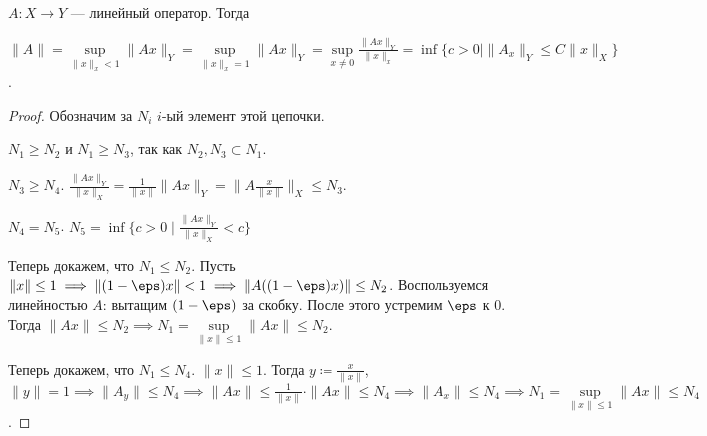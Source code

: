 \begin{theorem}
    $A\!: X \to Y$ --- линейный оператор. Тогда

     $\|A\| = \sup\limits_{\| x\|_x < 1} \|Ax\|_Y = \sup\limits_{\| x\|_x = 1} \|Ax\|_Y = \sup\limits_{x \neq 0} \frac{\|Ax\|_Y}{\|x\|_x} = \inf\{ c > 0 \mid \|A_x\|_Y \le C \|x\|_X\}$.
\end{theorem}
\begin{proof}
    Обозначим за $N_i$  $i$-ый элемент этой цепочки. 

     $N_1 \ge N_2$ и $N_1 \ge N_3$,  так как $N_2, N_3 \subset N_1$. 

     $N_3 \ge N_4$. $\frac{\|Ax\|_Y}{\|x\|_X} = \frac{1}{\|x\|}\|Ax\|_Y = \|A \frac{x}{\|x\|}\|_X \le N_3$.

     $N_4 = N_5$. $N_5 = \inf \{ c>0 \mid \frac{\|Ax\|_Y}{\|x\|_X} < c\}$

     Теперь докажем, что $N_1 \le N_2$. Пусть $\| x \| \le 1 \implies \| (1-\eps) x \| < 1 \implies \| A((1-\eps)x) \| \le N_2$. Воспользуемся линейностью $A$: вытащим  $(1-\eps)$ за скобку. После этого устремим  $\eps$ к 0. Тогда  $\| Ax \| \le N_2 \implies N_1 = \sup\limits_{\| x \| \le 1} \| A x\| \le N_2$.

     Теперь докажем, что $N_1 \le N_4$. $\| x \| \le 1$. Тогда $y \coloneqq \frac{x}{\| x \|}$, $\|y\| = 1 \implies \| A_y \| \le N_4 \implies \| Ax \| \le \frac{1}{\|x\|} \cdot \| Ax \| \le N_4 \implies \| A_x \| \le N_4 \implies N_1 = \sup\limits_{\|x \| \le 1} \|Ax\| \le N_4$.
\end{proof}
